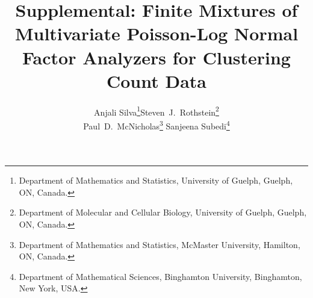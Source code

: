 \documentclass[12pt]{article}
\begin{document}
\title{Supplemental: Finite Mixtures of Multivariate Poisson-Log Normal Factor Analyzers for Clustering Count Data}

\author{Anjali Silva\footnote{Department of Mathematics and Statistics, University of Guelph, Guelph, ON, Canada.}\qquad\qquad\qquad Steven~J.~Rothstein\footnote{Department of Molecular and Cellular Biology, University of Guelph, Guelph, ON, Canada.}\\\hspace{-0.4in}Paul~D.~McNicholas\footnote{Department of Mathematics and Statistics, McMaster University, Hamilton, ON, Canada.} \qquad\qquad Sanjeena Subedi\footnote{Department of Mathematical Sciences, Binghamton University, Binghamton, New York, USA.}}
\date{}

\maketitle
\end{document}
